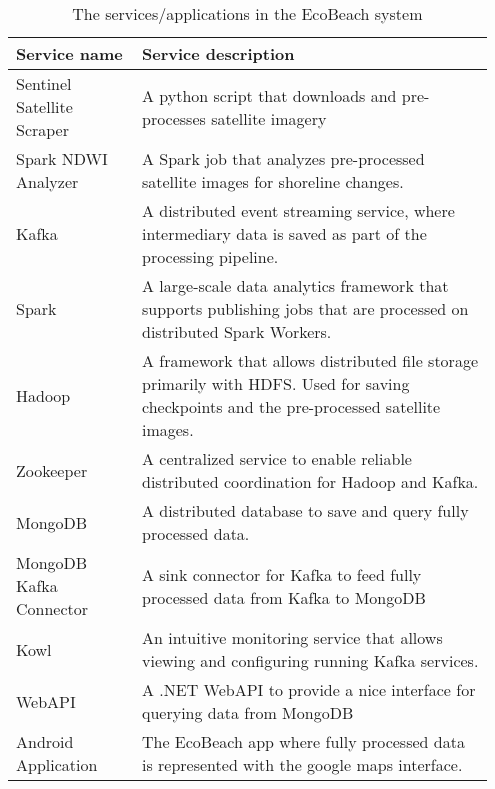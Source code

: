 \begin{table}[]
    \centering
    \begin{tabular}{| p{0.25\linewidth} | p{0.7\linewidth} |}
        \hline
        \textbf{Service name}      & \textbf{Service description}                                                                                                              \\ \hline
        Sentinel Satellite Scraper & A python script that downloads and pre-processes satellite imagery                                                                        \\\hline
        Spark NDWI Analyzer              & A Spark job that analyzes pre-processed satellite images for shoreline changes.                                                           \\\hline
        Kafka                      & A distributed event streaming service, where intermediary data is saved as part of the processing pipeline.                               \\\hline
        Spark                      & A large-scale data analytics framework that supports publishing jobs that are processed on distributed Spark Workers.                     \\\hline
        Hadoop                     & A framework that allows distributed file storage primarily with HDFS. Used for saving checkpoints and the pre-processed satellite images. \\\hline
        Zookeeper                  & A centralized service to enable reliable distributed coordination for Hadoop and Kafka.                                                   \\\hline
        MongoDB                    & A distributed database to save and query fully processed data.                                                                            \\\hline
        MongoDB Kafka Connector    & A sink connector for Kafka to feed fully processed data from Kafka to MongoDB                                                             \\\hline
        Kowl                       & An intuitive monitoring service that allows viewing and configuring running Kafka services.                                               \\\hline
        WebAPI                     & A .NET WebAPI to provide a nice interface for querying data from MongoDB                                                                  \\\hline
        Android Application        & The EcoBeach app where fully processed data is represented with the google maps interface.                                                \\\hline
    \end{tabular}
    \caption{The services/applications in the EcoBeach system}
    \label{tab:ecobeach-services}
\end{table}

